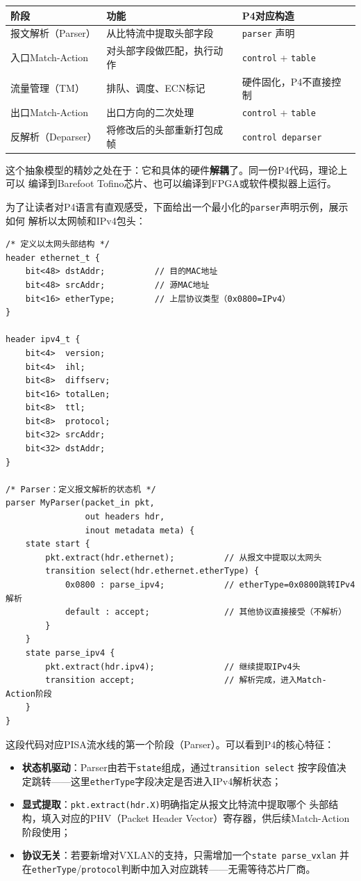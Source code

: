 \begin{center}
\begin{tabular}{|l|l|l|}
\hline
\textbf{阶段} & \textbf{功能} & \textbf{P4对应构造} \\
\hline
报文解析（Parser） & 从比特流中提取头部字段 & \texttt{parser} 声明 \\
入口Match-Action & 对头部字段做匹配，执行动作 & \texttt{control} + \texttt{table} \\
流量管理（TM） & 排队、调度、ECN标记 & 硬件固化，P4不直接控制 \\
出口Match-Action & 出口方向的二次处理 & \texttt{control} + \texttt{table} \\
反解析（Deparser） & 将修改后的头部重新打包成帧 & \texttt{control deparser} \\
\hline
\end{tabular}
\end{center}

这个抽象模型的精妙之处在于：它和具体的硬件\textbf{解耦}了。同一份P4代码，理论上可以
编译到Barefoot Tofino芯片、也可以编译到FPGA或软件模拟器上运行。

为了让读者对P4语言有直观感受，下面给出一个最小化的\texttt{parser}声明示例，展示如何
解析以太网帧和IPv4包头：

\begin{verbatim}
/* 定义以太网头部结构 */
header ethernet_t {
    bit<48> dstAddr;          // 目的MAC地址
    bit<48> srcAddr;          // 源MAC地址
    bit<16> etherType;        // 上层协议类型（0x0800=IPv4）
}

header ipv4_t {
    bit<4>  version;
    bit<4>  ihl;
    bit<8>  diffserv;
    bit<16> totalLen;
    bit<8>  ttl;
    bit<8>  protocol;
    bit<32> srcAddr;
    bit<32> dstAddr;
}

/* Parser：定义报文解析的状态机 */
parser MyParser(packet_in pkt,
                out headers hdr,
                inout metadata meta) {
    state start {
        pkt.extract(hdr.ethernet);          // 从报文中提取以太网头
        transition select(hdr.ethernet.etherType) {
            0x0800 : parse_ipv4;            // etherType=0x0800跳转IPv4解析
            default : accept;               // 其他协议直接接受（不解析）
        }
    }
    state parse_ipv4 {
        pkt.extract(hdr.ipv4);              // 继续提取IPv4头
        transition accept;                  // 解析完成，进入Match-Action阶段
    }
}
\end{verbatim}

这段代码对应PISA流水线的第一个阶段（Parser）。可以看到P4的核心特征：
\begin{itemize}
  \item \textbf{状态机驱动}：Parser由若干\texttt{state}组成，通过\texttt{transition select}
    按字段值决定跳转——这里\texttt{etherType}字段决定是否进入IPv4解析状态；
  \item \textbf{显式提取}：\texttt{pkt.extract(hdr.X)}明确指定从报文比特流中提取哪个
    头部结构，填入对应的PHV（Packet Header Vector）寄存器，供后续Match-Action阶段使用；
  \item \textbf{协议无关}：若要新增对VXLAN的支持，只需增加一个\texttt{state parse\_vxlan}
    并在\texttt{etherType}/\texttt{protocol}判断中加入对应跳转——无需等待芯片厂商。
\end{itemize}

